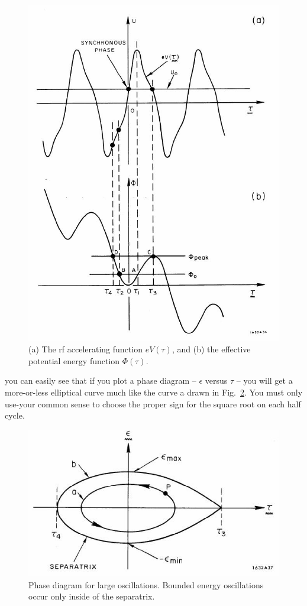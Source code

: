 \begin{figure}[!htb]
	\centering
	\includegraphics[width=0.8\linewidth]{./Figuras/fig36.jpeg}
	\caption{(a) The rf accelerating function $eV(\tau)$, and (b) the effective potential energy function $\Phi(\tau)$.}
	\label{fig:fig36}
\end{figure}

you can easily see that if you plot a phase diagram -- $\epsilon$ versus $\tau$ -- you will get
a more-or-less elliptical curve much like the curve a drawn in Fig.~\ref{fig:fig37}. You must only use-your common sense to choose the proper sign for the square root on each half cycle.

\begin{figure}[!htb]
	\centering
	\includegraphics[width=0.8\linewidth]{./Figuras/fig37.jpeg}
	\caption{Phase diagram for large oscillations. Bounded energy oscillations occur only inside of the separatrix.}
	\label{fig:fig37}
\end{figure}

